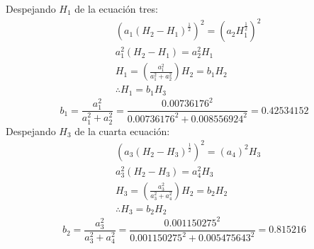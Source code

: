     Despejando $H_1$ de la ecuación tres:
    \begin{align*}
        &\left(a_1\left(H_2 - H_1\right)^{\frac{1}{2}}\right)^2 =\left(a_2H_1^{\frac{1}{2}}\right)^2\\
        &a_1^2\left(H_2 - H_1\right) = a_2^2H_1\\
        &H_1 =\left(\frac{a_1^2}{a_1^2 + a_2^2}\right)H_2 =b_1H_2\\
        &\therefore H_1 = b_1H_3
    \end{align*}
    \begin{equation*}
        b_1 = \frac{a_1^2}{a_1^2 + a_2^2} = \frac{0.00736176^2}{0.00736176^2 +0.008556924^2} =0.42534152
    \end{equation*}
    Despejando $H_3$ de la cuarta ecuación:
    \begin{align*}
        &\left(a_3(H_2 - H_3)^{\frac{1}{2}}\right)^{2} = \left(a_4\right)^2H_3\\
        &a_3^2(H_2 - H_3) = a_4^2H_3\\
        &H_3 = \left(\frac{a_3^2}{a_3^2 + a_4^2}\right)H_2 = b_2H_2\\
        &\therefore H_3 = b_2H_2
    \end{align*}
    \begin{equation*}
        b_2 = \frac{a_3^2}{a_3^2 + a_4^2} = \frac{0.001150275^2}{0.001150275^2 + 0.005475643^2} = 0.815216
    \end{equation*}
    
